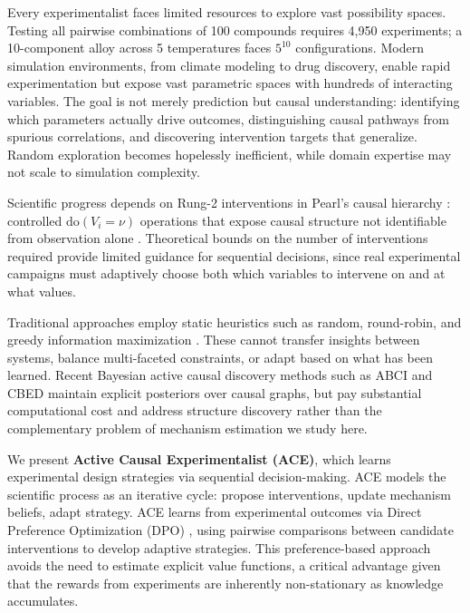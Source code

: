 \documentclass{article}
\theoremstyle{plain}
\theoremstyle{definition}
\theoremstyle{remark}
\begin{document}
Every experimentalist faces limited resources to explore vast possibility spaces. Testing all pairwise combinations of 100 compounds requires 4{,}950 experiments; a 10-component alloy across 5 temperatures faces $5^{10}$ configurations. Modern simulation environments, from climate modeling to drug discovery, enable rapid experimentation but expose vast parametric spaces with hundreds of interacting variables. The goal is not merely prediction but causal understanding: identifying which parameters actually drive outcomes, distinguishing causal pathways from spurious correlations, and discovering intervention targets that generalize. Random exploration becomes hopelessly inefficient, while domain expertise may not scale to simulation complexity.

Scientific progress depends on Rung-2 interventions in Pearl's causal hierarchy \citep{pearl2009causality,pearl2018book}: controlled $\text{do}(V_i = \nu)$ operations that expose causal structure not identifiable from observation alone \citep{spirtes2000causation,peters2017elements,reichenbach1956}. Theoretical bounds on the number of interventions required \citep{eberhardt2005number,hauser2012characterization} provide limited guidance for sequential decisions, since real experimental campaigns must adaptively choose both which variables to intervene on and at what values.

Traditional approaches employ static heuristics such as random, round-robin, and greedy information maximization \citep{murphy2001active,hauser2012characterization}. These cannot transfer insights between systems, balance multi-faceted constraints, or adapt based on what has been learned. Recent Bayesian active causal discovery methods such as ABCI \citep{toth2022active} and CBED \citep{tigas2022interventions} maintain explicit posteriors over causal graphs, but pay substantial computational cost and address structure discovery rather than the complementary problem of mechanism estimation we study here.

We present \textbf{Active Causal Experimentalist (ACE)}, which learns experimental design strategies via sequential decision-making. ACE models the scientific process as an iterative cycle: propose interventions, update mechanism beliefs, adapt strategy. ACE learns from experimental outcomes via Direct Preference Optimization (DPO) \citep{rafailov2023direct}, using pairwise comparisons between candidate interventions to develop adaptive strategies. This preference-based approach avoids the need to estimate explicit value functions, a critical advantage given that the rewards from experiments are inherently non-stationary as knowledge accumulates.
\end{document}
